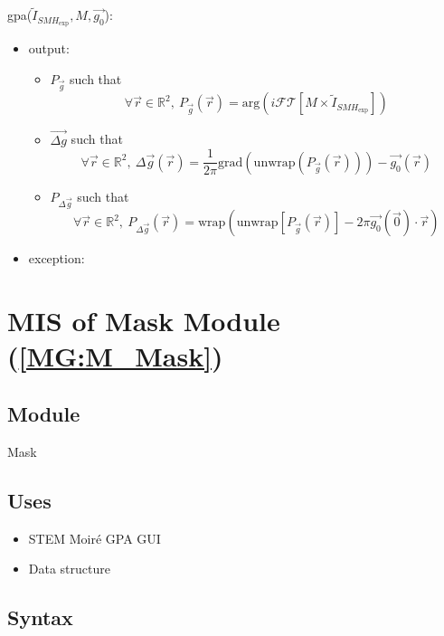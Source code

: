 \documentclass[12pt, titlepage]{article}
\begin{document}
\noindent gpa($\widetilde{I}_{\mathit{SMH}_{\text{exp}}},M,\overrightarrow{g_0}$):
\begin{itemize} 
\item output: 
\begin{itemize}
	\item $P_{\vec{g}}$ such that
	\begin{equation*}
	\forall \vec{r} \in \mathbb{R}^2, \ P_{\vec{g}}(\vec{r})=\text{arg}(i\mathcal{FT}[M\times\widetilde{I}_{\mathit{SMH}_{\text{exp}}}])
	\end{equation*}
	\item $\overrightarrow{\Delta g}$ such that
	\begin{equation*}
	\forall \vec{r} \in \mathbb{R}^2, \ \Delta \overrightarrow{g}(\vec{r})=\frac{1}{2\pi}\text{grad}(\text{unwrap}(P_{\vec{g}}(\vec{r})))-\overrightarrow{g_0}(\vec{r})
	\end{equation*}
	\item $P_{\Delta \vec{g}}$ such that
	\begin{equation*}
	\forall \vec{r} \in \mathbb{R}^2, \ P_{\Delta \vec{g}}(\vec{r})=\text{wrap}(\text{unwrap}[P_{\vec{g}}(\vec{r})]-2\pi\overrightarrow{g_0}(\vec{0})\cdot \vec{r})
	\end{equation*}
\end{itemize}
\item exception:  
\end{itemize}

\section{MIS of Mask Module (\texorpdfstring{\cref{MG:M_Mask}}))} \label{MIS_Mask}

\subsection{Module}
Mask
\subsection{Uses}
\begin{itemize}
\item STEM Moir{\'e} GPA GUI
\item Data structure
\end{itemize}

\subsection{Syntax}
\end{document}
